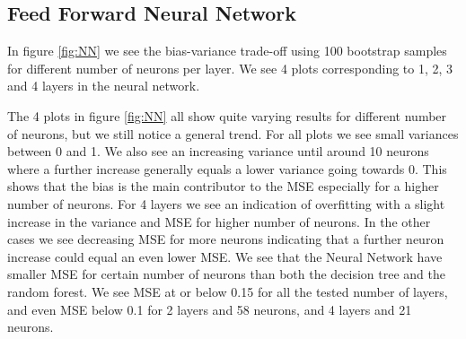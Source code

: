 \documentclass[11pt]{article}
\begin{document}
\subsection*{Feed Forward Neural Network}
In figure \ref{fig:NN} we see the bias-variance trade-off using 100 bootstrap samples for different number of neurons per layer. We see 4 plots corresponding to 1, 2, 3 and 4 layers in the neural network.

The 4 plots in figure \ref{fig:NN} all show quite varying results for different number of neurons, but we still notice a general trend. For all plots we see small variances between 0 and 1. We also see an increasing variance until around 10 neurons where a further increase generally equals a lower variance going towards 0. This shows that the bias is the main contributor to the MSE especially for a higher number of neurons. For 4 layers we see an indication of overfitting with a slight increase in the variance and MSE for higher number of neurons. In the other cases we see decreasing MSE for more neurons indicating that a further neuron increase could equal an even lower MSE. We see that the Neural Network have smaller MSE for certain number of neurons than both the decision tree and the random forest. We see MSE at or below 0.15 for all the tested number of layers, and even MSE below 0.1 for 2 layers and 58 neurons, and 4 layers and 21 neurons.
\end{document}
